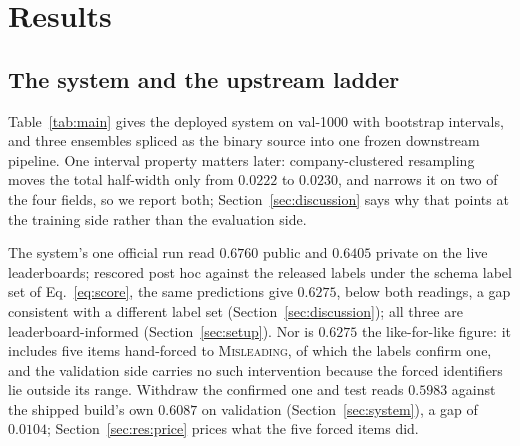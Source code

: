 \section{Results}
\label{sec:results}

\subsection{The system and the upstream ladder}
\label{sec:res:main}

Table~\ref{tab:main} gives the deployed system on val-1000 with bootstrap
intervals, and three ensembles spliced as the binary source into one
frozen downstream pipeline. One interval property matters later: company-clustered resampling
moves the total half-width only from $0.0222$ to $0.0230$, and narrows it on two of the four
fields, so we report both; Section~\ref{sec:discussion} says why that points at the training side
rather than the evaluation side.

The system's one official run read $0.6760$ public and $0.6405$ private on the live
leaderboards; rescored post hoc against the released labels under the schema label set of
Eq.~\eqref{eq:score}, the same predictions give $0.6275$, below both readings, a gap consistent with a different label set
(Section~\ref{sec:discussion}); all three are leaderboard-informed (Section~\ref{sec:setup}). Nor is $0.6275$ the
like-for-like figure: it includes five items
hand-forced to \textsc{Misleading}, of which the labels confirm one, and the validation side
carries no such intervention because the forced identifiers lie outside its range. Withdraw the
confirmed one and test reads $0.5983$ against the shipped build's own $0.6087$ on validation
(Section~\ref{sec:system}), a gap of $0.0104$; Section~\ref{sec:res:price} prices what the five
forced items did.

